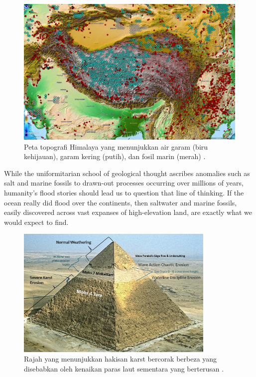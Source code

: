 \documentclass[10pt,twocolumn,letterpaper]{article}
\begin{document}
\begin{figure}[t]
\begin{center}
   \includegraphics[width=1\linewidth]{tibet.jpg}
\end{center}
   \caption{Peta topografi Himalaya yang menunjukkan air garam (biru kehijauan), garam kering (putih), dan fosil marin (merah) \cite{15,16,86,87}.}
\label{fig:3}
\label{fig:onecol}
\end{figure}

While the uniformitarian school of geological thought ascribes anomalies such as salt and marine fossils to drawn-out processes occurring over millions of years, humanity's flood stories should lead us to question that line of thinking. If the ocean really did flood over the continents, then saltwater and marine fossils, easily discovered across vast expanses of high-elevation land, are exactly what we would expect to find.

\begin{figure}[t]
\begin{center}
\includegraphics[width=0.85\textwidth]{khafre.jpg}
\end{center}
   \caption{Rajah yang menunjukkan hakisan karst bercorak berbeza yang disebabkan oleh kenaikan paras laut sementara yang berterusan \cite{27}.}
\label{fig:4}
\end{figure}
\end{document}

